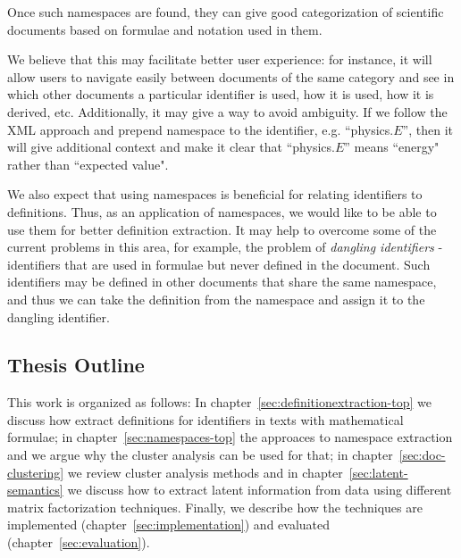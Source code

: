 Once such namespaces are found, they can give good categorization of scientific documents based on formulae and notation used in them.

We believe that this may facilitate better user experience: for instance, it will allow users to navigate easily between documents of the same category and see in which other documents a particular identifier is used, how it is used, how it is derived, etc. Additionally, it may give a way to avoid ambiguity. If we follow the XML approach \cite{xmlnamespaces} and prepend namespace to the identifier, e.g. ``physics.$E$'', then it will give additional context and make it clear that ``physics.$E$'' means ``energy" rather than ``expected value".

We also expect that using namespaces is beneficial for relating identifiers to definitions. Thus, as an application of namespaces, we would like to be able to use them for better definition extraction. It may help to overcome some of the current problems in this area, for example, the problem of \emph{dangling identifiers} \cite{pagael2014mlp} - identifiers that are used in formulae but never defined in the document. Such identifiers may be defined in other documents that share the same namespace, and thus we can take the definition from the namespace and assign it to the dangling identifier.


\subsection{Thesis Outline}


This work is organized as follows: 
In chapter~\ref{sec:definitionextraction-top} we discuss how extract
definitions for identifiers in texts with mathematical formulae;
in chapter~\ref{sec:namespaces-top} the approaces to namespace
extraction and we argue why the cluster analysis can be used for that;
in chapter~\ref{sec:doc-clustering} we review cluster analysis methods
and in chapter~\ref{sec:latent-semantics} we discuss how to extract
latent information from data using different matrix factorization
techniques. Finally, we describe how the techniques are implemented
(chapter~\ref{sec:implementation}) and evaluated (chapter~\ref{sec:evaluation}).

